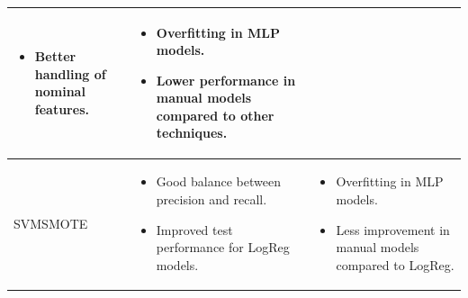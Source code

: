 \documentclass[a4paper,12pt]{article}
\begin{document}
\begin{table}[h!]
\begin{tabularx}{\textwidth}{|l|X|X|}
\begin{itemize}
        \item Better handling of nominal features.
    \end{itemize} & 
    \begin{itemize}
        \item Overfitting in MLP models.
        \item Lower performance in manual models compared to other techniques.
    \end{itemize} \\
    \hline
    SVMSMOTE & 
    \begin{itemize}
        \item Good balance between precision and recall.
        \item Improved test performance for LogReg models.
    \end{itemize} & 
    \begin{itemize}
        \item Overfitting in MLP models.
        \item Less improvement in manual models compared to LogReg.
    \end{itemize} \\
    \hline
    \end{tabularx}
\end{table}
\end{document}
